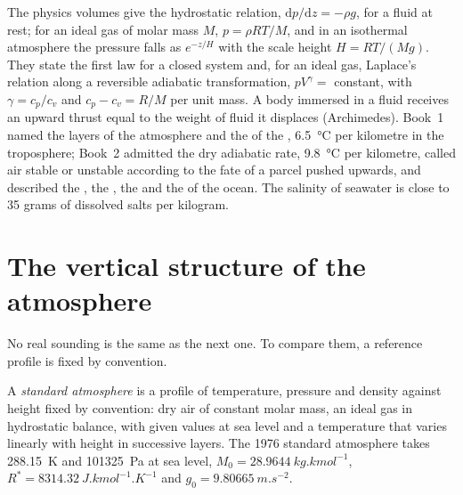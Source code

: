 \begin{recall}
The physics volumes give the hydrostatic relation, $\mathrm dp/\mathrm dz =
-\rho g$, for a fluid at rest; for an ideal gas of molar mass $M$, $p = \rho R
T/M$, and in an isothermal atmosphere the pressure falls as $e^{-z/H}$ with the
scale height $H = RT/(Mg)$. They state the first law for a closed system and,
for an ideal gas, Laplace's relation along a reversible adiabatic
transformation, $pV^{\gamma} = $ constant, with $\gamma = c_p/c_v$ and $c_p - c_v
= R/M$ per unit mass. A body immersed in a fluid receives an upward thrust equal
to the weight of fluid it displaces (Archimedes). Book~1 named the layers of the
atmosphere and the  of the ,
\qty{6.5}{\celsius} per kilometre in the troposphere; Book~2 admitted the dry
adiabatic rate, \qty{9.8}{\celsius} per kilometre, called air stable or unstable
according to the fate of a parcel pushed upwards, and described the ,
the , the  and the  of the ocean. The salinity of
seawater is close to 35 grams of dissolved salts per kilogram.
\end{recall}

\section{The vertical structure of the atmosphere}\label{sec:b1:fluid-envelopes-structure:atmosphere}

No real sounding is the same as the next one. To compare them, a reference
profile is fixed by convention.

\begin{definition}\label{def:b1:fluid-envelopes-structure:standard-atmosphere}
A \emph{standard atmosphere} is a profile of
temperature, pressure and density against height fixed by convention: dry air
of constant molar mass, an ideal gas in hydrostatic balance, with given values at
sea level and a temperature that varies linearly with height in successive
layers. The 1976 standard atmosphere takes \qty{288.15}{K} and
\qty{101325}{Pa} at sea level, $M_0 = \qty{28.9644}{kg.kmol^{-1}}$,
$R^* = \qty{8314.32}{J.kmol^{-1}.K^{-1}}$ and $g_0 = \qty{9.80665}{m.s^{-2}}$.
\end{definition}

